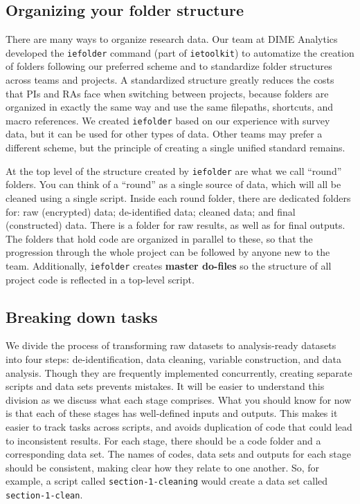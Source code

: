 \subsection{Organizing your folder structure}

There are many ways to organize research data.
Our team at DIME Analytics developed the \texttt{iefolder}
command (part of \texttt{ietoolkit})
to automatize the creation of folders following our preferred scheme and
to standardize folder structures across teams and projects.
A standardized structure greatly reduces the costs that PIs and RAs
face when switching between projects,
because folders are organized in exactly the same way
and use the same filepaths, shortcuts, and macro references.
We created \texttt{iefolder} based on our experience with survey data,
but it can be used for other types of data.
Other teams may prefer a different scheme, but
the principle of creating a single unified standard remains.

At the top level of the structure created by \texttt{iefolder} are what we call ``round'' folders.
You can think of a ``round'' as a single source of data,
which will all be cleaned using a single script.
Inside each round folder, there are dedicated folders for:
raw (encrypted) data; de-identified data; cleaned data; and final (constructed) data.
There is a folder for raw results, as well as for final outputs.
The folders that hold code are organized in parallel to these,
so that the progression through the whole project can be followed by anyone new to the team.
Additionally, \texttt{iefolder} creates \textbf{master do-files}
so the structure of all project code is reflected in a top-level script.

\subsection{Breaking down tasks}

We divide the process of transforming raw datasets to analysis-ready datasets into four steps:
de-identification, data cleaning, variable construction, and data analysis.
Though they are frequently implemented concurrently,
creating separate scripts and data sets prevents mistakes.
It will be easier to understand this division as we discuss what each stage comprises.
What you should know for now is that each of these stages has well-defined inputs and outputs.
This makes it easier to track tasks across scripts,
and avoids duplication of code that could lead to inconsistent results.
For each stage, there should be a code folder and a corresponding data set.
The names of codes, data sets and outputs for each stage should be consistent,
making clear how they relate to one another.
So, for example, a script called \texttt{section-1-cleaning} would create
a data set called \texttt{section-1-clean}.

